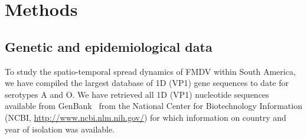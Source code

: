 \documentclass[10pt]{article}
\begin{document}
% 

\section*{Methods}

\subsection*{Genetic and epidemiological data}

To study the spatio-temporal spread dynamics of FMDV within South America, we have compiled the largest database of 1D (VP1) gene sequences to date for serotypes A and O.
We have retrieved all 1D (VP1) nucleotide sequences available from GenBank~\cite{Benson2013} from the National Center for Biotechnology Information (NCBI, \url{ http://www.ncbi.nlm.nih.gov/}) for which information on country and year of isolation was available.
\end{document}
